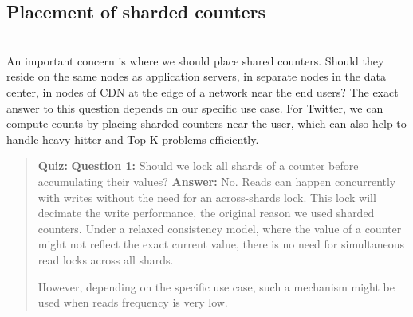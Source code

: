 \subsection{Placement of sharded counters}\label{vEeZeqQPS4ove4VqQMR1n}
\\
\hfill\break
An important concern is where we should place shared counters. Should they reside on the same nodes as application servers, in separate nodes in the data center, in nodes of CDN at the edge of a network near the end users? The exact answer to this question depends on our specific use case. For Twitter, we can compute counts by placing sharded counters near the user, which can also help to handle heavy hitter and Top K problems efficiently.

\begin{quote}
\textbf{Quiz:}
\textbf{Question 1:} Should we lock all shards of a counter before accumulating their values?
\textbf{Answer:} No. Reads can happen concurrently with writes without the need for an across-shards lock. This lock will decimate the write performance, the original reason we used sharded counters. Under a relaxed consistency model, where the value of a counter might not reflect the exact current value, there is no need for simultaneous read locks across all shards.

However, depending on the specific use case, such a mechanism might be used when reads frequency is very low.
\end{quote}

